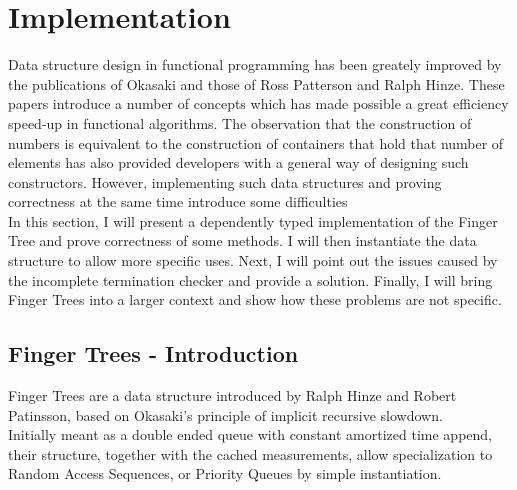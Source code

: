 \documentclass[12pt,twoside,notitlepage]{report}
\begin{document}

\chapter{Implementation}

Data structure design in functional programming has been greately improved by the publications of Okasaki \cite{okasaki} and those of Ross Patterson and Ralph Hinze. These papers introduce a number of concepts which has made possible a great efficiency speed-up in functional algorithms. The observation that the construction of numbers is equivalent to the construction of containers that hold that number of elements \cite{numerical} \cite{okasaki} has also provided developers with a general way of designing such constructors. However, implementing such data structures and proving correctness at the same time introduce some difficulties\\

In this section, I will present a dependently typed implementation of the Finger Tree\cite{rpat} and prove correctness of some methods. I will then instantiate the data structure to allow more specific uses. Next, I will point out the issues caused by the incomplete termination checker and provide a solution. Finally, I will 
bring Finger Trees into a larger context and show how these problems are not specific.    

\section{Finger Trees - Introduction} 

Finger Trees are a data structure introduced by Ralph Hinze and Robert Patinsson, based on Okasaki's principle of implicit recursive slowdown. \\ 
Initially meant as a double ended queue with constant amortized time append, their structure, together with the cached measurements, allow specialization to Random Access Sequences, or Priority Queues by simple instantiation. \\ 

\end{document}
